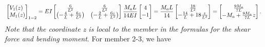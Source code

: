 \documentclass{AeroStructure-ERJohnson}
\begin{document}
\begin{example}
\begin{align}
\left[\begin{array}{@{}l@{}}V_{1}(z) \\M_{1}(z)\end{array}\right]_{1-2}=E I\left[\begin{array}{@{}cc@{}}\frac{6}{L^{2}} & \frac{6}{L^{2}} \\\left(-\frac{4}{L}+\frac{6 z}{L^{2}}\right)&\left(-\frac{2}{L}+\frac{6 z}{L^{2}}\right)\end{array}\right] \frac{M_{a} L}{14 E I}\left[\begin{array}{@{}c@{}}4 \\-1\end{array}\right]=\frac{M_{a} L}{14}\left[\begin{array}{@{}c@{}}\frac{18}{L^{2}} \\-\frac{14}{L}+18 \frac{z}{L^{2}}\end{array}\right]=\left[\begin{array}{@{}c@{}}\frac{9 M_{a}}{7 L} \\-M_{a}+\frac{9 M_{a}}{7 L }z\end{array}\right].
\end{align}
\textit{Note that the coordinate z is local to the member in the formulas for the shear force and bending moment}. For member 2-3, we have\vspace*{-2pc}



\end{example}
\end{document}
